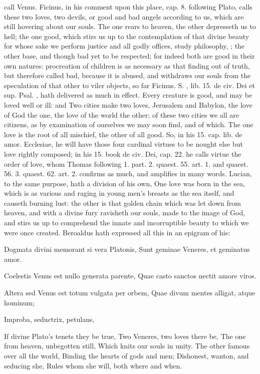 {call Venus. Ficinus, in his comment upon this place, cap. 8. following
Plato, calls these two loves, two devils, or good and bad angels
according to us, which are still hovering about our souls. The
one rears to heaven, the other depresseth us to hell; the one good,
which stirs us up to the contemplation of that divine beauty for whose
sake we perform justice and all godly offices, study philosophy, \etc{};
the other base, and though bad yet to be respected; for indeed both are
good in their own natures: procreation of children is as necessary as
that finding out of truth, but therefore called bad, because it is
abused, and withdraws our souls from the speculation of that other to
viler objects, so far Ficinus. S. \Austin{}, lib. 15. de civ. Dei et sup.
Psal. , hath delivered as much in effect. Every creature is
good, and may be loved well or ill: and Two cities make two
loves, Jerusalem and Babylon, the love of God the one, the love of the
world the other; of these two cities we all are citizens, as by
examination of ourselves we may soon find, and of which. The one love
is the root of all mischief, the other of all good. So, in his 15. cap.
lib. de amor. Ecclesiae, he will have those four cardinal virtues to be
nought else but love rightly composed; in his 15. book de civ. Dei,
cap. 22. he calls virtue the order of love, whom Thomas following 1.
part. 2. quaest. 55. art. 1. and quaest. 56. 3. quaest. 62. art. 2.
confirms as much, and amplifies in many words. Lucian, to the
same purpose, hath a division of his own, One love was born in the sea,
which is as various and raging in young men's breasts as the sea
itself, and causeth burning lust: the other is that golden chain which
was let down from heaven, and with a divine fury ravisheth our souls,
made to the image of God, and stirs us up to comprehend the innate and
incorruptible beauty to which we were once created. Beroaldus hath
expressed all this in an epigram of his:

Dogmata divini memorant si vera Platonis,
Sunt geminae Veneres, et geminatus amor.

Coelestis Venus est nullo generata parente,
Quae casto sanctos nectit amore viros.

Altera sed Venus est totum vulgata per orbem,
Quae divum mentes alligat, atque hominum;

Improba, seductrix, petulans, \etc{}

If divine Plato's tenets they be true,
Two Veneres, two loves there be,
The one from heaven, unbegotten still,
Which knits our souls in unity.
The other famous over all the world,
Binding the hearts of gods and men;
Dishonest, wanton, and seducing she,
Rules whom she will, both where and when.

}
